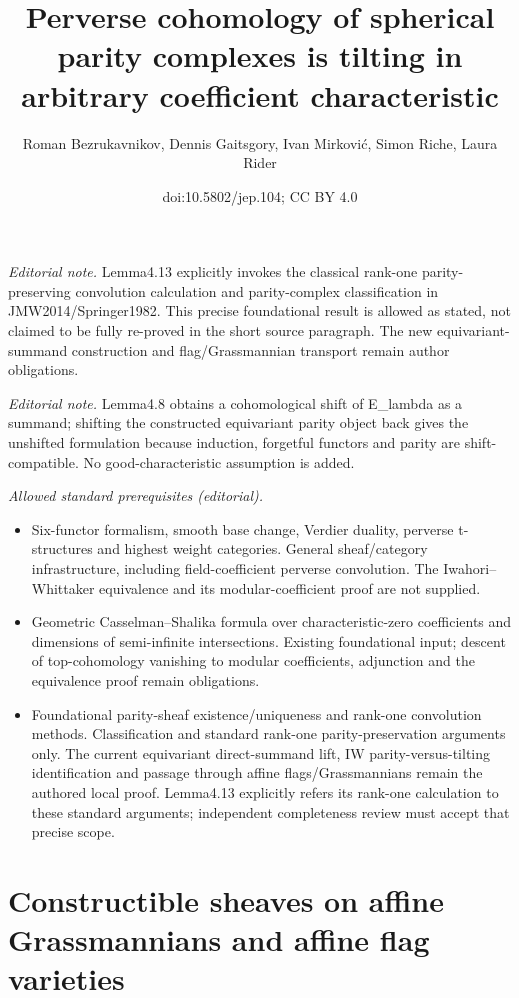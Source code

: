 \documentclass[10pt,a4paper]{amsart}
\title{Perverse cohomology of spherical parity complexes is tilting in arbitrary coefficient characteristic}
\author{Roman Bezrukavnikov, Dennis Gaitsgory, Ivan Mirković, Simon Riche, Laura Rider}
\date{doi:10.5802/jep.104; CC BY 4.0}
\theoremstyle{remark}
\numberwithin{equation}{section}
\begin{document}
\maketitle
\noindent\textit{Editorial note.} Lemma4.13 explicitly invokes the classical rank-one parity-preserving convolution calculation and parity-complex classification in JMW2014/Springer1982. This precise foundational result is allowed as stated, not claimed to be fully re-proved in the short source paragraph. The new equivariant-summand construction and flag/Grassmannian transport remain author obligations.\par\medskip
\noindent\textit{Editorial note.} Lemma4.8 obtains a cohomological shift of E\_lambda as a summand; shifting the constructed equivariant parity object back gives the unshifted formulation because induction, forgetful functors and parity are shift-compatible. No good-characteristic assumption is added.\par\medskip
\noindent\textit{Allowed standard prerequisites (editorial).}\begin{itemize}
\item Six-functor formalism, smooth base change, Verdier duality, perverse t-structures and highest weight categories. General sheaf/category infrastructure, including field-coefficient perverse convolution. The Iwahori–Whittaker equivalence and its modular-coefficient proof are not supplied.
\item Geometric Casselman–Shalika formula over characteristic-zero coefficients and dimensions of semi-infinite intersections. Existing foundational input; descent of top-cohomology vanishing to modular coefficients, adjunction and the equivalence proof remain obligations.
\item Foundational parity-sheaf existence/uniqueness and rank-one convolution methods. Classification and standard rank-one parity-preservation arguments only. The current equivariant direct-summand lift, IW parity-versus-tilting identification and passage through affine flags/Grassmannians remain the authored local proof. Lemma4.13 explicitly refers its rank-one calculation to these standard arguments; independent completeness review must accept that precise scope.
\end{itemize}\medskip
\section{Constructible sheaves on affine Grassmannians and affine flag varieties}
\label{jep104local028}
\end{document}
